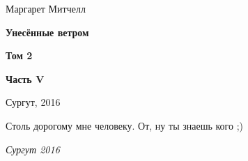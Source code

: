 \documentclass[a4paper,openany]{scrbook}
\begin{document}
\thispagestyle{empty}
\begin{center}
\Large Маргарет Митчелл
\end{center}
\vspace{6cm}
\begin{center}
\Huge {\textbf{Унесённые ветром}}
\end{center}
\vspace{1cm}
\begin{center}
\huge {\textbf{Том 2}}
\end{center}
\vspace{0.25cm}
\begin{center}
\huge {\textbf{Часть V}}
\end{center}
\vspace*{\fill}
\begin{center}
{\large \textsf{Сургут, 2016}}
\end{center}
\clearpage
\thispagestyle{plain}
    {\LARGE Столь дорогому мне человеку.} 
\vfill
    От, ну ты знаешь кого ;)
\clearpage
\tableofcontents
\sloppy
\addtocounter{chapter}{47}
\Large
















%
%
\bigskip

\begin{flushright}
\textit{Сургут 2016}
\end{flushright}
\end{document}
